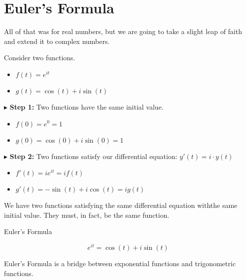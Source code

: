 \documentclass{ximera}
\begin{document}
\section{Euler's Formula}

All of that was for real numbers, but we are going to take a slight leap of faith and extend it to complex numbers.




Consider two functions.


\begin{itemize}
	\item $f(t) = e^{i t}$
	\item $g(t) = \cos(t) + i \sin(t)$
\end{itemize}




$\blacktriangleright$   \textbf{Step 1:} Two functions have the same initial value.

\begin{itemize}
	\item $f(0) = e^0 = 1$
	\item $g(0) = \cos(0) + i \sin(0) = 1$
\end{itemize}





$\blacktriangleright$   \textbf{Step 2:} Two functions satisfy our differential equation: $y'(t) = i \cdot y(t)$



\begin{itemize}
	\item $f'(t) = i e^{i t} = i f(t)$
	\item $g'(t) = -\sin(t) + i \cos(t) = i g(t)$
\end{itemize}



We have two functions satisfying the same differential equation withthe same initial value.  They must, in fact, be the same function. \\




\begin{theorem} Euler's Formula


\[   e^{i t} = \cos(t) + i \sin(t)         \]


\end{theorem}




Euler's Formula is a bridge between exponential functions and trigonometric functions.
\end{document}
